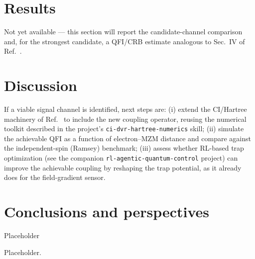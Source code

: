 \documentclass[aps,pra,reprint,superscriptaddress,longbibliography]{revtex4-2}
\begin{document}
\section{Results}

Not yet available — this section will report the candidate-channel comparison and, for the
strongest candidate, a QFI/CRB estimate analogous to Sec.~IV of Ref.~\cite{perruzza2026}.

\section{Discussion}

If a viable signal channel is identified, next steps are: (i) extend the CI/Hartree machinery of
Ref.~\cite{beysengulov2024} to include the new coupling operator, reusing the numerical toolkit
described in the project's \texttt{ci-dvr-hartree-numerics} skill; (ii) simulate the achievable QFI
as a function of electron--MZM distance and compare against the independent-spin (Ramsey) benchmark;
(iii) assess whether RL-based trap optimization (see the companion \texttt{rl-agentic-quantum-control}
project) can improve the achievable coupling by reshaping the trap potential, as it already does for
the field-gradient sensor.
\section{Conclusions and perspectives}
Placeholder
\begin{acknowledgments}
Placeholder.
\end{acknowledgments}


\end{document}
